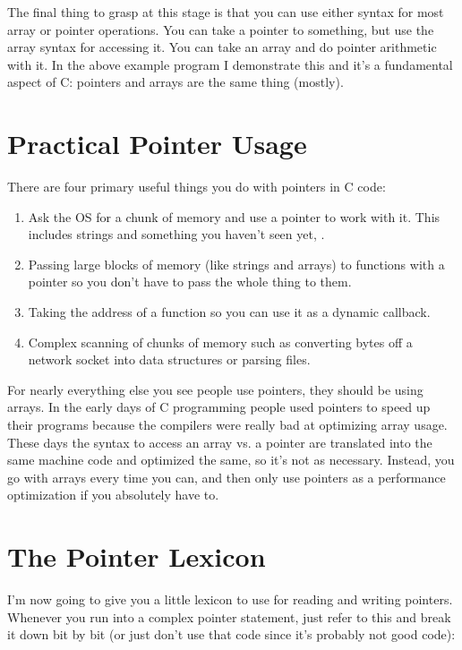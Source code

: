 The final thing to grasp at this stage is that you can use either syntax
for most array or pointer operations.  You can take a pointer to something,
but use the array syntax for accessing it.  You can take an array and do
pointer arithmetic with it.  In the above example program I demonstrate this
and it's a fundamental aspect of C: pointers and arrays are the same thing (mostly).

\section{Practical Pointer Usage}

There are four primary useful things you do with pointers in C code:

\begin{enumerate}
\item Ask the OS for a chunk of memory and use a pointer
    to work with it.  This includes strings and something you haven't seen
    yet, .
\item Passing large blocks of memory (like strings and arrays) to functions
    with a pointer so you don't have to pass the whole thing to them.
\item Taking the address of a function so you can use it as a dynamic callback.
\item Complex scanning of chunks of memory such as converting bytes off a network
    socket into data structures or parsing files.
\end{enumerate}

For nearly everything else you see people use pointers, they should be using
arrays.  In the early days of C programming people used pointers to speed
up their programs because the compilers were really bad at optimizing array 
usage.  These days the syntax to access an array vs. a pointer are translated
into the same machine code and optimized the same, so it's not as necessary.
Instead, you go with arrays every time you can, and then only use pointers
as a performance optimization if you absolutely have to.


\section{The Pointer Lexicon}

I'm now going to give you a little lexicon to use for reading and writing
pointers.  Whenever you run into a complex pointer statement, just refer
to this and break it down bit by bit (or just don't use that code since it's
probably not good code):

